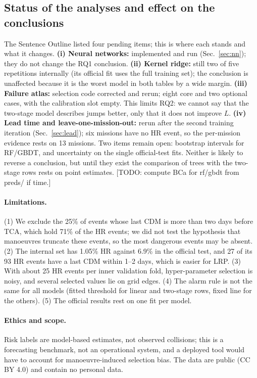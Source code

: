 \documentclass[clean,twocolumn]{bam-proposal}
\newcommand{\todo}[1]{{\color{red}[TODO: #1]}}
\begin{document}
\subsection{Status of the analyses and effect on the conclusions}\label{sec:status}
The Sentence Outline listed four pending items; this is where each stands and what it changes.
\textbf{(i) Neural networks:} implemented and run (Sec.~\ref{sec:nn}); they do not change the RQ1 conclusion.
\textbf{(ii) Kernel ridge:} still two of five repetitions internally (its official fit uses the full training set); the conclusion is unaffected because it is the worst model in both tables by a wide margin.
\textbf{(iii) Failure atlas:} selection code corrected and rerun; eight core and two optional cases, with the calibration slot empty. This limits RQ2: we cannot say that the two-stage model describes jumps better, only that it does not improve $L$.
\textbf{(iv) Lead time and leave-one-mission-out:} rerun after the second training iteration (Sec.~\ref{sec:lead}); six missions have no HR event, so the per-mission evidence rests on 13 missions.
Two items remain open: bootstrap intervals for RF/GBDT, and uncertainty on the single official-test fits. Neither is likely to reverse a conclusion, but until they exist the comparison of trees with the two-stage rows rests on point estimates. \todo{compute BCa for rf/gbdt from preds/ if time.}

\paragraph{Limitations.} (1) We exclude the 25\% of events whose last CDM is more than two days before TCA, which hold 71\% of the HR events; we did not test the hypothesis that manoeuvres truncate these events, so the most dangerous events may be absent. (2) The internal set has 1.05\% HR against 6.9\% in the official test, and 27 of its 93 HR events have a last CDM within 1--2 days, which is easier for LRP. (3) With about 25 HR events per inner validation fold, hyper-parameter selection is noisy, and several selected values lie on grid edges. (4) The alarm rule is not the same for all models (fitted threshold for linear and two-stage rows, fixed line for the others). (5) The official results rest on one fit per model.

\paragraph{Ethics and scope.} Risk labels are model-based estimates, not observed collisions; this is a forecasting benchmark, not an operational system, and a deployed tool would have to account for manoeuvre-induced selection bias. The data are public (CC BY 4.0) and contain no personal data.
\end{document}
